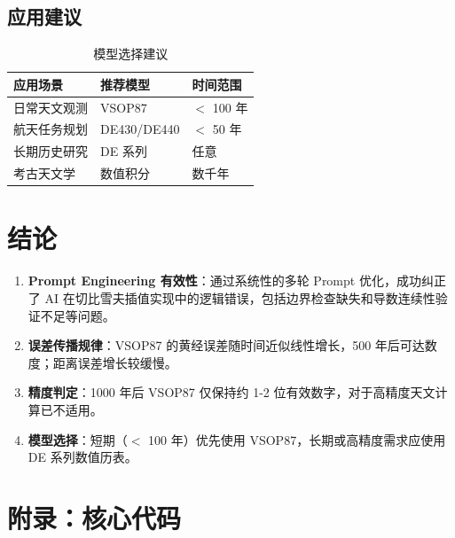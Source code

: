 \documentclass[12pt,a4paper]{article}
\begin{document}
\subsection{应用建议}

\begin{table}[H]
\centering
\caption{模型选择建议}
\begin{tabular}{lll}
\toprule
\textbf{应用场景} & \textbf{推荐模型} & \textbf{时间范围} \\
\midrule
日常天文观测 & VSOP87 & $<$ 100 年 \\
航天任务规划 & DE430/DE440 & $<$ 50 年 \\
长期历史研究 & DE 系列 & 任意 \\
考古天文学 & 数值积分 & 数千年 \\
\bottomrule
\end{tabular}
\end{table}

\section{结论}

\begin{enumerate}
    \item \textbf{Prompt Engineering 有效性}：通过系统性的多轮 Prompt 优化，成功纠正了 AI 在切比雪夫插值实现中的逻辑错误，包括边界检查缺失和导数连续性验证不足等问题。
    
    \item \textbf{误差传播规律}：VSOP87 的黄经误差随时间近似线性增长，500 年后可达数度；距离误差增长较缓慢。
    
    \item \textbf{精度判定}：1000 年后 VSOP87 仅保持约 1-2 位有效数字，对于高精度天文计算已不适用。
    
    \item \textbf{模型选择}：短期（$<$ 100 年）优先使用 VSOP87，长期或高精度需求应使用 DE 系列数值历表。
\end{enumerate}

\section*{附录：核心代码}
\end{document}
